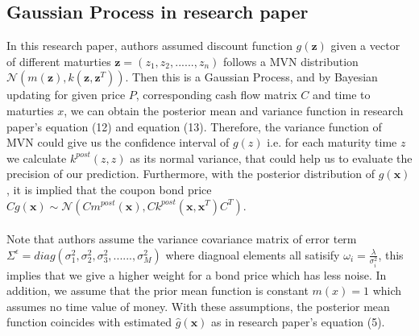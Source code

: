 \subsection{Gaussian Process in research paper}
In this research paper, authors assumed discount function $g(\boldsymbol{z})$ given a vector of different maturties $\boldsymbol{z} = (z_1, z_2, ......, z_n)$ follows a MVN distribution $\mathcal{N}(m(\boldsymbol{z}), k(\boldsymbol{z}, \boldsymbol{z}^T))$. Then this is a Gaussian Process, and by Bayesian updating for given price $P$, corresponding cash flow matrix $C$ and time to maturties $x$, we can obtain the posterior mean and variance function in research paper's equation (12) and equation (13). Therefore, the variance function of MVN could give us the confidence interval of $g(z)$ i.e. for each maturity time $z$ we calculate $k^{post}(z,z)$ as its normal variance, that could help us to evaluate the precision of our prediction. Furthermore, with the posterior distribution of $g(\boldsymbol{x})$, it is implied that the coupon bond price $Cg(\boldsymbol{x}) \sim \mathcal{N}(Cm^{post}(\boldsymbol{x}), Ck^{post}(\boldsymbol{x},\boldsymbol{x}^T)C^T)$. \\ \\
Note that authors assume the variance covariance matrix of error term $\varSigma^{\epsilon} = diag(\sigma_{1}^{2}, \sigma_{2}^{2}, \sigma_{3}^{2}, ......, \sigma_{M}^{2}) $ where diagnoal elements all satisify $\omega_i = \frac{\lambda}{\sigma_{i}^{2}}$, this implies that we give a higher weight for a bond price which has less noise. In addition, we assume that the prior mean function is constant $m(x) = 1$ which assumes no time value of money. With these assumptions, the posterior mean function coincides with estimated $\hat{g}(\boldsymbol{x})$ as in research paper's equation (5). 



